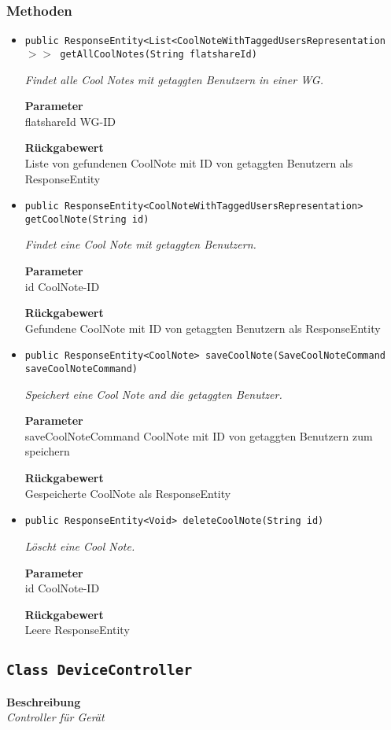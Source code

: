     \subsubsection*{Methoden}
    \begin{itemize}
    	\item{\texttt{public ResponseEntity<List<CoolNoteWithTaggedUsersRepresentation$>>$ getAllCoolNotes(String flatshareId)}}
    	
    	\textit{Findet alle Cool Notes mit getaggten Benutzern in einer WG.}
    	
    	\textbf{Parameter} \\
    	flatshareId WG-ID
    	
    	\textbf{Rückgabewert} \\
    	Liste von gefundenen CoolNote mit ID von getaggten Benutzern als ResponseEntity        \item{\texttt{public ResponseEntity<CoolNoteWithTaggedUsersRepresentation> getCoolNote(String id)}}
    	
    	\textit{Findet eine Cool Note mit getaggten Benutzern.}
    	
    	\textbf{Parameter} \\
    	id CoolNote-ID
    	
    	\textbf{Rückgabewert} \\
    	Gefundene CoolNote mit ID von getaggten Benutzern als ResponseEntity        \item{\texttt{public ResponseEntity<CoolNote> saveCoolNote(SaveCoolNoteCommand saveCoolNoteCommand)}}
    	
    	\textit{Speichert eine Cool Note and die getaggten Benutzer.}
    	
    	\textbf{Parameter} \\
    	saveCoolNoteCommand CoolNote mit ID von getaggten Benutzern zum speichern
    	
    	\textbf{Rückgabewert} \\
    	Gespeicherte CoolNote als ResponseEntity        \item{\texttt{public ResponseEntity<Void> deleteCoolNote(String id)}}
    	
    	\textit{Löscht eine Cool Note.}
    	
    	\textbf{Parameter} \\
    	id CoolNote-ID
    	
    	\textbf{Rückgabewert} \\
    	Leere ResponseEntity
    \end{itemize}
    \subsection{\texttt{Class DeviceController}}
    \textbf{Beschreibung} \\
    \textit{Controller für Gerät}
